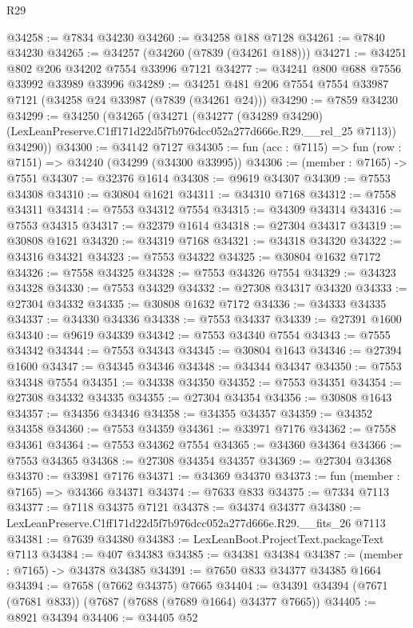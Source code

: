 \begin{lexlean}{R29}
\begin{coremodule}
@34258 := @7834 @34230
@34260 := @34258 @188 @7128
@34261 := @7840 @34230
@34265 := @34257 (@34260 (@7839 (@34261 @188)))
@34271 := @34251 @802 @206 @34202 @7554 @33996 @7121
@34277 := @34241 @800 @688 @7556 @33992 @33989 @33996
@34289 := @34251 @481 @206 @7554 @7554 @33987 @7121 (@34258 @24 @33987 (@7839 (@34261 @24)))
@34290 := @7859 @34230
@34299 := @34250
    (@34265
      (@34271
        (@34277
          (@34289 @34290)
          (LexLeanPreserve.C1ff171d22d5f7b976dcc052a277d666e.R29.__rel_25 @7113))
        @34290))
@34300 := @34142 @7127
@34305 := fun (acc : @7115) => fun (row : @7151) => @34240 (@34299 (@34300 @33995))
@34306 := (member : @7165) -> @7551
@34307 := @32376 @1614
@34308 := @9619 @34307
@34309 := @7553 @34308
@34310 := @30804 @1621
@34311 := @34310 @7168
@34312 := @7558 @34311
@34314 := @7553 @34312 @7554
@34315 := @34309 @34314
@34316 := @7553 @34315
@34317 := @32379 @1614
@34318 := @27304 @34317
@34319 := @30808 @1621
@34320 := @34319 @7168
@34321 := @34318 @34320
@34322 := @34316 @34321
@34323 := @7553 @34322
@34325 := @30804 @1632 @7172
@34326 := @7558 @34325
@34328 := @7553 @34326 @7554
@34329 := @34323 @34328
@34330 := @7553 @34329
@34332 := @27308 @34317 @34320
@34333 := @27304 @34332
@34335 := @30808 @1632 @7172
@34336 := @34333 @34335
@34337 := @34330 @34336
@34338 := @7553 @34337
@34339 := @27391 @1600
@34340 := @9619 @34339
@34342 := @7553 @34340 @7554
@34343 := @7555 @34342
@34344 := @7553 @34343
@34345 := @30804 @1643
@34346 := @27394 @1600
@34347 := @34345 @34346
@34348 := @34344 @34347
@34350 := @7553 @34348 @7554
@34351 := @34338 @34350
@34352 := @7553 @34351
@34354 := @27308 @34332 @34335
@34355 := @27304 @34354
@34356 := @30808 @1643
@34357 := @34356 @34346
@34358 := @34355 @34357
@34359 := @34352 @34358
@34360 := @7553 @34359
@34361 := @33971 @7176
@34362 := @7558 @34361
@34364 := @7553 @34362 @7554
@34365 := @34360 @34364
@34366 := @7553 @34365
@34368 := @27308 @34354 @34357
@34369 := @27304 @34368
@34370 := @33981 @7176
@34371 := @34369 @34370
@34373 := fun (member : @7165) => @34366 @34371
@34374 := @7633 @833
@34375 := @7334 @7113
@34377 := @7118 @34375 @7121
@34378 := @34374 @34377
@34380 := LexLeanPreserve.C1ff171d22d5f7b976dcc052a277d666e.R29.__fits_26 @7113
@34381 := @7639 @34380
@34383 := LexLeanBoot.ProjectText.packageText @7113
@34384 := @407 @34383
@34385 := @34381 @34384
@34387 := (member : @7165) -> @34378 @34385
@34391 := @7650 @833 @34377 @34385 @1664
@34394 := @7658 (@7662 @34375) @7665
@34404 := @34391 @34394 (@7671 (@7681 @833)) (@7687 (@7688 (@7689 @1664) @34377 @7665))
@34405 := @8921 @34394
@34406 := @34405 @52

\end{coremodule}
\end{lexlean}
